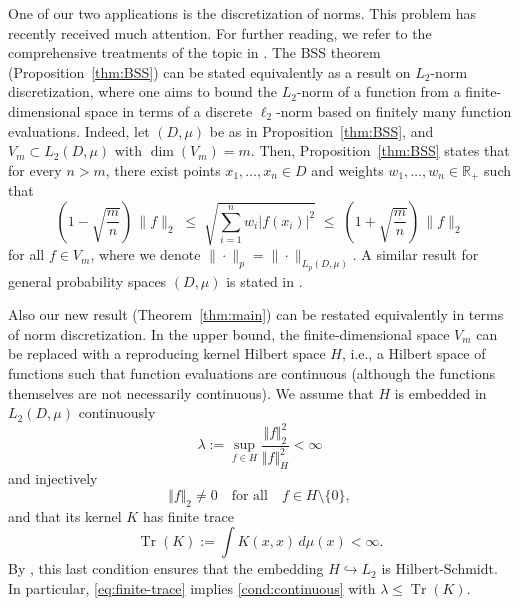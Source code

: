 \documentclass[a4paper,11pt]{article}
\renewcommand{\(}{\left (}
\renewcommand{\)}{\right )}
\newcommand{\<}{\langle}
\renewcommand{\>}{\rangle}
\newcommand{\R}{\mathbb{R}}
\theoremstyle{definition}
\DeclareMathOperator{\Tr}{Tr}
\begin{document}
One of our two applications is the discretization of norms. This problem has recently received much attention. For further reading, we refer to the comprehensive treatments of the topic in \cite{Groe,KKLT,LMT,T18}. 
The BSS theorem (Proposition~\ref{thm:BSS}) can be stated 
equivalently as a result on $L_2$-norm discretization, 
where one aims to bound the $L_2$-norm of a function from a finite-dimensional space in terms of a discrete $\ell_2$-norm based on finitely many function evaluations.
Indeed, let $(D,\mu)$ be as in Proposition~\ref{thm:BSS}, and 
$V_m\subset L_2(D,\mu)$ with $\dim(V_m)=m$.  
Then, Proposition~\ref{thm:BSS} states that for every $n>m$, there exist points $x_1,\dots,x_n\in D$ and weights $w_1,\dots,w_n\in \R_+$ such that
\begin{equation} \label{eq:BSS-d}
\left(1-\sqrt{\frac{m}{n}}\right)\,\|f\|_2 
\;\leq\; 
\sqrt{\sum_{i=1}^n w_i|f(x_i)|^2}
\;\leq\; \left(1+\sqrt{\frac{m}{n}}\right)\,\|f\|_2
\end{equation}
for all $f\in V_m$, where we denote $\|\cdot\|_p=\|\cdot\|_{L_p(D,\mu)}$.
A similar result for general probability spaces $(D,\mu)$ is stated in \cite[Theorem~6.4]{DPSTT}.

Also our new result (Theorem~\ref{thm:main}) can be restated equivalently in terms of norm discretization.
In the upper bound,
the finite-dimensional space $V_m$
can be replaced with a reproducing kernel Hilbert space $H$, i.e.,
a Hilbert space of functions such that function evaluations are continuous (although the functions themselves are not necessarily continuous). 
We assume that $H$ is 
embedded 
in $L_2(D,\mu)$ continuously 
\begin{equation}\label{cond:continuous}
\lambda:=\sup_{f\in H} \frac{\Vert f \Vert_2^2}{\Vert f \Vert_H^2}<\infty
\end{equation}
and injectively
\begin{equation}\label{cond:injective}
 \Vert f \Vert_2 \ne 0
 \quad \text{for all} \quad f\in H \setminus \{0\},
\end{equation}
and that its kernel $K$ has finite trace 
\begin{equation}\label{eq:finite-trace}
 \Tr(K) := \int K(x,x)\,d\mu(x) < \infty.
\end{equation}
By \cite[Lemma~2.3]{Steinwart-Scovel}, this last condition ensures that the embedding $H\hookrightarrow L_2$ is Hilbert-Schmidt. In particular, \eqref{eq:finite-trace} implies \eqref{cond:continuous} with $\lambda\leq \Tr(K)$.

\smallskip
\end{document}
